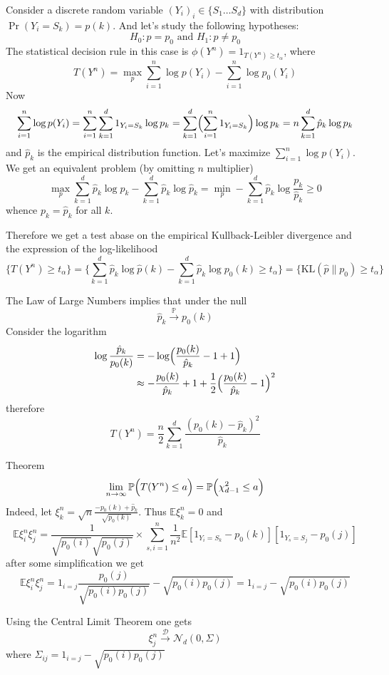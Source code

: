 \documentclass[a4paper]{article}
\newcommand{\Ncal}{\mathcal{N}}
\newcommand{\Dcal}{\mathcal{D}}
\newcommand{\ex}{\mathbb{E}}
\newcommand{\pr}{\mathbb{P}}
\begin{document}
Consider a discrete random variable $(Y_i)_i\in \{S_1\ldots S_d\}$ with distribution
$\Pr(Y_i = S_k) = p(k)$. And let's study the following hypotheses:
\[ H_0: p = p_0\text{ and } H_1: p\neq p_0 \]
The statistical decision rule in this case is $ \phi(Y^n) = 1_{T(Y^n) \geq t_\alpha} $,
where 
\[
T(Y^n)
= \max_{p} \sum_{i=1}^n \log p(Y_i) - \sum_{i=1}^n \log p_0(Y_i)
\]
Now
\[
\sum_{i=1}^n \log p(Y_i)
= \sum_{i=1}^n \sum_{k=1}^d 1_{Y_i = S_k} \log p_k
= \sum_{k=1}^d \Bigl( \sum_{i=1}^n 1_{Y_i = S_k} \Bigr) \log p_k
= n \sum_{k=1}^d \hat{p}_k \log p_k
\]
and $\hat{p}_k$ is the empirical distribution function. Let's maximize $\sum_{i=1}^n \log p(Y_i)$.
We get an equivalent problem (by omitting $n$ multiplier)
\[
\max_{p} \sum_{k=1}^d \hat{p}_k \log p_k - \sum_{k=1}^d \hat{p}_k \log \hat{p}_k
= \min_{p} - \sum_{k=1}^d \hat{p}_k \log \frac{p_k}{\hat{p}_k}
\geq 0
\]
whence $p_k = \hat{p}_k$ for all $k$.

Therefore we get a test abase on the empirical Kullback-Leibler divergence and
the expression of the log-likelihood
\[
\{ T(Y^n) \geq t_\alpha \}
= \{
\sum_{k=1}^d \hat{p}_k \log \hat{p}(k) - 
\sum_{k=1}^d \hat{p}_k \log p_0(k)
\geq t_\alpha
\}
= \{ \text{KL}( \hat{p}\| p_0) \geq t_\alpha \}
\]

The Law of Large Numbers implies that under the null
\[ \hat{p}_k \overset{\pr}{\to} p_0(k) \]
Consider the logarithm
\begin{align*}
	\log \frac{\hat{p}_k}{p_0(k)}
	&= - \log \Bigl( \frac{p_0(k)}{\hat{p}_k} - 1 + 1 \Bigr)\\
	&\approx - \frac{p_0(k)}{\hat{p}_k} + 1
		+ \frac{1}{2} \Bigl( \frac{p_0(k)}{\hat{p}_k} - 1 \Bigr)^2
\end{align*}
therefore
\[
T(Y^n) = \frac{n}{2} \sum_{k=1}^d \frac{(p_0(k)-\hat{p}_k)^2}{\hat{p}_k}
\]

Theorem
\[ \lim_{n\to \infty} \pr\Bigl( T(Y^n) \leq a \Bigr) = \pr\Bigl( \chi^2_{d-1} \leq a\Bigr)\]
Indeed, let $\xi^n_k  = \sqrt{n}\frac{-p_0(k)+\hat{p}_k}{\sqrt{p_0(k)}}$. Thus
$\ex\xi^n_k = 0$ and 
\[
\ex \xi^n_i \xi^n_j
= \frac{1}{\sqrt{p_0(i)}\sqrt{p_0(j)}}
 \times \sum_{s,i=1}^n \frac{1}{n^2} \ex [1_{Y_i = S_k} - p_0(k)][1_{Y_s = S_j} - p_0(j)]
\]
after some simplification we get
\[
\ex \xi^n_i \xi^n_j
= 1_{i=j} \frac{p_0(j)}{\sqrt{p_0(i) p_0(j)}} - \sqrt{p_0(i) p_0(j)}
= 1_{i=j} - \sqrt{p_0(i) p_0(j)}
\]

Using the Central Limit Theorem one gets
\[
\xi^n_j \overset{\Dcal}{\to} \Ncal_d(0, \Sigma)
\]
where $\Sigma_{ij} = 1_{i=j} - \sqrt{p_0(i) p_0(j)}$
\end{document}
